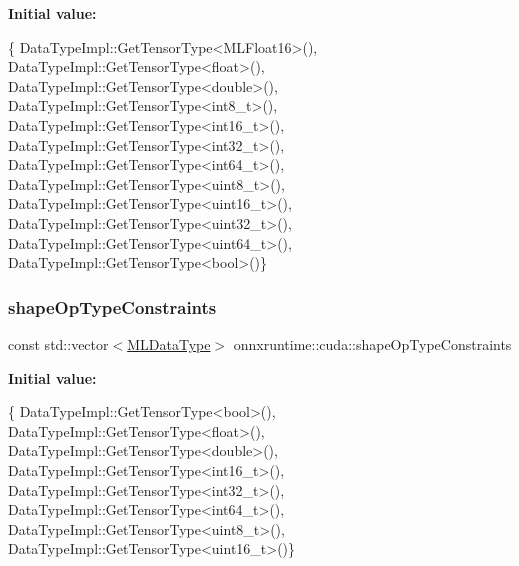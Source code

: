 {\bfseries Initial value\+:}
\begin{DoxyCode}
\{
    DataTypeImpl::GetTensorType<MLFloat16>(),
    DataTypeImpl::GetTensorType<float>(),
    DataTypeImpl::GetTensorType<double>(),
    DataTypeImpl::GetTensorType<int8\_t>(),
    DataTypeImpl::GetTensorType<int16\_t>(),
    DataTypeImpl::GetTensorType<int32\_t>(),
    DataTypeImpl::GetTensorType<int64\_t>(),
    DataTypeImpl::GetTensorType<uint8\_t>(),
    DataTypeImpl::GetTensorType<uint16\_t>(),
    DataTypeImpl::GetTensorType<uint32\_t>(),
    DataTypeImpl::GetTensorType<uint64\_t>(),
    DataTypeImpl::GetTensorType<bool>()\}
\end{DoxyCode}
\mbox{\label{namespaceonnxruntime_1_1cuda_aa2fb1530bbf277f6572e0c2865818fad}} 
\subsubsection{\texorpdfstring{shape\+Op\+Type\+Constraints}{shapeOpTypeConstraints}}
{\footnotesize\ttfamily const std\+::vector$<$\mbox{\hyperlink{namespaceonnxruntime_ad77d0a6e838ec7da5dc35fed5ee66b49}{M\+L\+Data\+Type}}$>$ onnxruntime\+::cuda\+::shape\+Op\+Type\+Constraints}

{\bfseries Initial value\+:}
\begin{DoxyCode}
\{
    DataTypeImpl::GetTensorType<bool>(),
    DataTypeImpl::GetTensorType<float>(),
    DataTypeImpl::GetTensorType<double>(),
    DataTypeImpl::GetTensorType<int16\_t>(),
    DataTypeImpl::GetTensorType<int32\_t>(),
    DataTypeImpl::GetTensorType<int64\_t>(),
    DataTypeImpl::GetTensorType<uint8\_t>(),
    DataTypeImpl::GetTensorType<uint16\_t>()\}
\end{DoxyCode}
